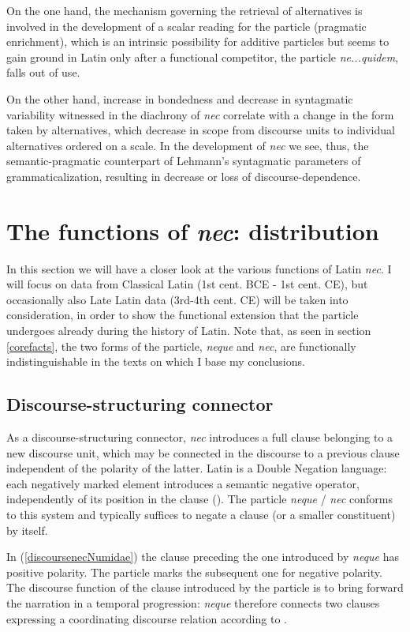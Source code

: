 \documentclass[output=paper,modfonts,nonflat,citecolor=brown,
showindex
]{langsci/langscibook}
\begin{document}
On the one hand, the mechanism governing the retrieval of alternatives is involved in the development of a scalar reading for the particle (pragmatic enrichment), which is an intrinsic possibility for additive particles but seems to gain ground in Latin only after a functional competitor, the particle {\em{ne...quidem}}, falls out of use.  

On the other hand, increase in bondedness and decrease in syntagmatic variability witnessed in the diachrony of {\em{nec}} correlate with a change in the form taken by alternatives, which decrease in scope from discourse units to individual alternatives ordered on a scale. In the development of {\em{nec}} we see, thus, the semantic-pragmatic counterpart of Lehmann's syntagmatic parameters of grammaticalization, resulting in decrease or loss of discourse-dependence.  

\section{The functions of {\em{nec}}: distribution} \label{distributionfunctions}

In this section we will have a closer look at the various functions of Latin {\em{nec}}. I will focus on data from Classical Latin (1st cent. BCE - 1st cent. CE), but occasionally also Late Latin data (3rd-4th cent. CE) will be taken into consideration, in order to show the functional extension that the particle undergoes already during the history of Latin. Note that, as seen in section \ref{corefacts}, the two forms of the particle, {\em{neque}} and {\em{nec}}, are functionally indistinguishable in the texts on which I base my conclusions.

\subsection{Discourse-structuring connector}

As a discourse-structuring connector, {\em{nec}} introduces a full clause belonging to a new discourse unit, which may be connected in the discourse to a previous clause independent of the polarity of the latter. Latin is a Double Negation language: each negatively marked element introduces a semantic negative operator, independently of its position in the clause (\citealt[]{Gianollo16}). The particle {\em{neque}} / {\em{nec}} conforms to this system and typically suffices to negate a clause (or a smaller constituent) by itself.

In (\ref{discoursenecNumidae}) the clause preceding the one introduced by {\em{neque}} has positive polarity. The particle marks the subsequent one for negative polarity. The discourse function of the clause introduced by the particle is to bring forward the narration in a temporal progression: {\em{neque}} therefore connects two clauses expressing a coordinating discourse relation according to \citet[]{Asher93}.
\end{document}
